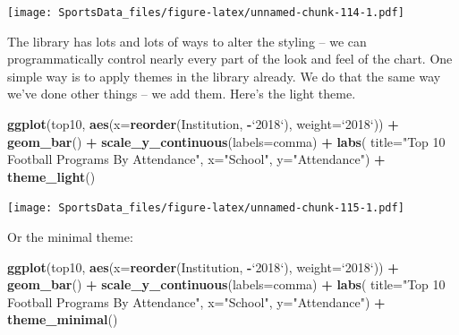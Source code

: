 \documentclass[
]{book}
\newenvironment{Shaded}{\begin{snugshade}}{\end{snugshade}}
\newcommand{\DataTypeTok}[1]{\textcolor[rgb]{0.13,0.29,0.53}{#1}}
\newcommand{\KeywordTok}[1]{\textcolor[rgb]{0.13,0.29,0.53}{\textbf{#1}}}
\newcommand{\NormalTok}[1]{#1}
\newcommand{\OperatorTok}[1]{\textcolor[rgb]{0.81,0.36,0.00}{\textbf{#1}}}
\newcommand{\StringTok}[1]{\textcolor[rgb]{0.31,0.60,0.02}{#1}}
\begin{document}
\texttt{[image: SportsData\_files/figure-latex/unnamed-chunk-114-1.pdf]}

The library has lots and lots of ways to alter the styling -- we can programmatically control nearly every part of the look and feel of the chart. One simple way is to apply themes in the library already. We do that the same way we've done other things -- we add them. Here's the light theme.

\begin{Shaded}
\begin{Highlighting}[]
\KeywordTok{ggplot}\NormalTok{(top10, }\KeywordTok{aes}\NormalTok{(}\DataTypeTok{x=}\KeywordTok{reorder}\NormalTok{(Institution, }\OperatorTok{-}\StringTok{`}\DataTypeTok{2018}\StringTok{`}\NormalTok{), }\DataTypeTok{weight=}\StringTok{`}\DataTypeTok{2018}\StringTok{`}\NormalTok{)) }\OperatorTok{+}\StringTok{ }
\StringTok{  }\KeywordTok{geom_bar}\NormalTok{() }\OperatorTok{+}\StringTok{ }
\StringTok{  }\KeywordTok{scale_y_continuous}\NormalTok{(}\DataTypeTok{labels=}\NormalTok{comma) }\OperatorTok{+}\StringTok{ }
\StringTok{  }\KeywordTok{labs}\NormalTok{(}
    \DataTypeTok{title=}\StringTok{"Top 10 Football Programs By Attendance"}\NormalTok{, }
    \DataTypeTok{x=}\StringTok{"School"}\NormalTok{, }
    \DataTypeTok{y=}\StringTok{"Attendance"}\NormalTok{) }\OperatorTok{+}\StringTok{ }
\StringTok{  }\KeywordTok{theme_light}\NormalTok{()}
\end{Highlighting}
\end{Shaded}

\texttt{[image: SportsData\_files/figure-latex/unnamed-chunk-115-1.pdf]}

Or the minimal theme:

\begin{Shaded}
\begin{Highlighting}[]
\KeywordTok{ggplot}\NormalTok{(top10, }\KeywordTok{aes}\NormalTok{(}\DataTypeTok{x=}\KeywordTok{reorder}\NormalTok{(Institution, }\OperatorTok{-}\StringTok{`}\DataTypeTok{2018}\StringTok{`}\NormalTok{), }\DataTypeTok{weight=}\StringTok{`}\DataTypeTok{2018}\StringTok{`}\NormalTok{)) }\OperatorTok{+}\StringTok{ }
\StringTok{  }\KeywordTok{geom_bar}\NormalTok{() }\OperatorTok{+}\StringTok{ }
\StringTok{  }\KeywordTok{scale_y_continuous}\NormalTok{(}\DataTypeTok{labels=}\NormalTok{comma) }\OperatorTok{+}\StringTok{ }
\StringTok{  }\KeywordTok{labs}\NormalTok{(}
    \DataTypeTok{title=}\StringTok{"Top 10 Football Programs By Attendance"}\NormalTok{, }
    \DataTypeTok{x=}\StringTok{"School"}\NormalTok{, }
    \DataTypeTok{y=}\StringTok{"Attendance"}\NormalTok{) }\OperatorTok{+}\StringTok{ }
\StringTok{  }\KeywordTok{theme_minimal}\NormalTok{()}
\end{Highlighting}
\end{Shaded}
\end{document}
